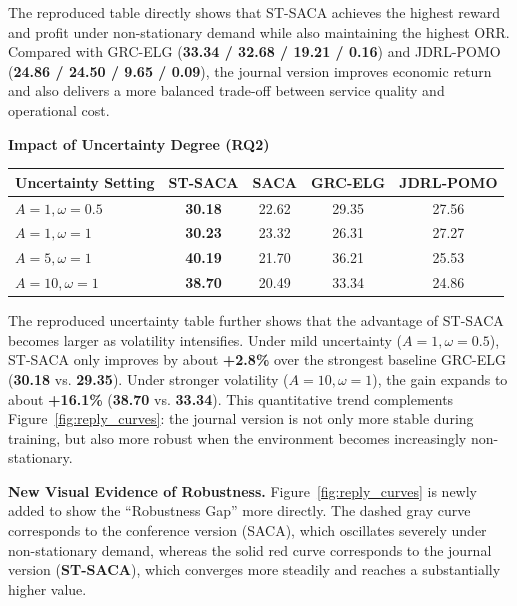 \documentclass[11pt, a4paper]{article}
\begin{document}
\begin{itemize}
\begin{boxedminipage}[htbp]{\linewidth}
    The reproduced table directly shows that ST-SACA achieves the highest reward and profit under non-stationary demand while also maintaining the highest ORR. Compared with GRC-ELG (\textbf{33.34 / 32.68 / 19.21 / 0.16}) and JDRL-POMO (\textbf{24.86 / 24.50 / 9.65 / 0.09}), the journal version improves economic return and also delivers a more balanced trade-off between service quality and operational cost.

    \textbf{Impact of Uncertainty Degree (RQ2)}

    \begin{center}
    \captionsetup{font=normalsize}
    \normalsize
    \setlength{\tabcolsep}{2.5pt}
    \begin{tabular}{@{}lcccc@{}}
    \toprule
    Uncertainty Setting & ST-SACA & SACA & GRC-ELG & JDRL-POMO \\
    \midrule
    $A = 1, \omega = 0.5$ & \textbf{30.18} & 22.62 & 29.35 & 27.56 \\
    $A = 1, \omega = 1$ & \textbf{30.23} & 23.32 & 26.31 & 27.27 \\
    $A = 5, \omega = 1$ & \textbf{40.19} & 21.70 & 36.21 & 25.53 \\
    $A = 10, \omega = 1$ & \textbf{38.70} & 20.49 & 33.34 & 24.86 \\
    \bottomrule
    \end{tabular}
    \end{center}

    The reproduced uncertainty table further shows that the advantage of ST-SACA becomes larger as volatility intensifies. Under mild uncertainty ($A = 1, \omega = 0.5$), ST-SACA only improves by about \textbf{+2.8\%} over the strongest baseline GRC-ELG (\textbf{30.18} vs. \textbf{29.35}). Under stronger volatility ($A = 10, \omega = 1$), the gain expands to about \textbf{+16.1\%} (\textbf{38.70} vs. \textbf{33.34}). This quantitative trend complements Figure~\ref{fig:reply_curves}: the journal version is not only more stable during training, but also more robust when the environment becomes increasingly non-stationary.
    \end{boxedminipage}

    \textbf{New Visual Evidence of Robustness.}
    Figure~\ref{fig:reply_curves} is newly added to show the ``Robustness Gap'' more directly. The dashed gray curve corresponds to the conference version (SACA), which oscillates severely under non-stationary demand, whereas the solid red curve corresponds to the journal version (\textbf{ST-SACA}), which converges more steadily and reaches a substantially higher value.


\end{itemize}
\end{document}
